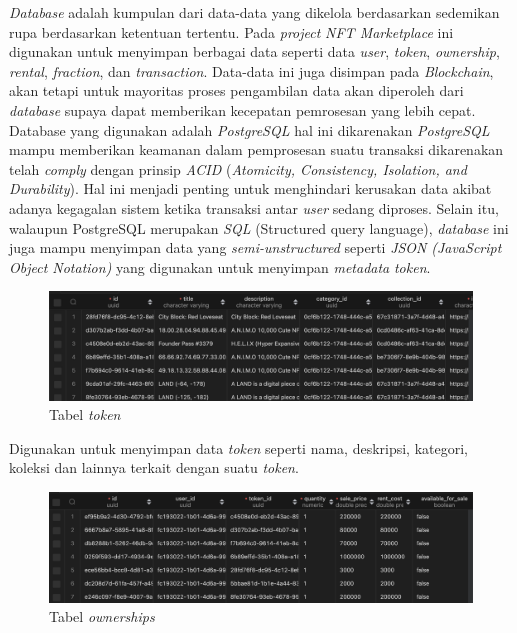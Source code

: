 \emph{Database} adalah kumpulan dari data-data yang dikelola berdasarkan sedemikan rupa berdasarkan ketentuan tertentu. Pada \emph{project} \emph{NFT Marketplace} ini digunakan untuk menyimpan berbagai data seperti data \emph{user}, \emph{token}, \emph{ownership}, \emph{rental}, \emph{fraction}, dan \emph{transaction}. Data-data ini juga disimpan pada \emph{Blockchain}, akan tetapi untuk mayoritas proses pengambilan data akan diperoleh dari \emph{database} supaya dapat memberikan kecepatan pemrosesan yang lebih cepat. Database yang digunakan adalah \emph{PostgreSQL} hal ini dikarenakan \emph{PostgreSQL} mampu memberikan keamanan dalam pemprosesan suatu transaksi dikarenakan telah \emph{comply} dengan prinsip \emph{ACID} (\emph{Atomicity, Consistency, Isolation, and Durability}). Hal ini menjadi penting untuk menghindari kerusakan data akibat adanya kegagalan sistem ketika transaksi antar \emph{user} sedang diproses. Selain itu, walaupun PostgreSQL merupakan \emph{SQL} (Structured query language), \emph{database} ini juga mampu menyimpan data yang \emph{semi-unstructured} seperti \emph{JSON} \emph{(JavaScript Object Notation)} yang digunakan untuk menyimpan \emph{metadata} \emph{token}.

\begin{figure} [H] \centering
  \includegraphics[scale=0.35]{gambar/img-table-tokens.png}
  \caption{Tabel \emph{token}}
  \label{fig:TokenTable}
\end{figure}

Digunakan untuk menyimpan data \emph{token} seperti nama, deskripsi, kategori, koleksi dan lainnya terkait dengan suatu \emph{token}.

\begin{figure} [H] \centering
  \includegraphics[scale=0.35]{gambar/img-table-ownerships.png}
  \caption{Tabel \emph{ownerships} }
  \label{fig:OwnershipTable}
\end{figure}

